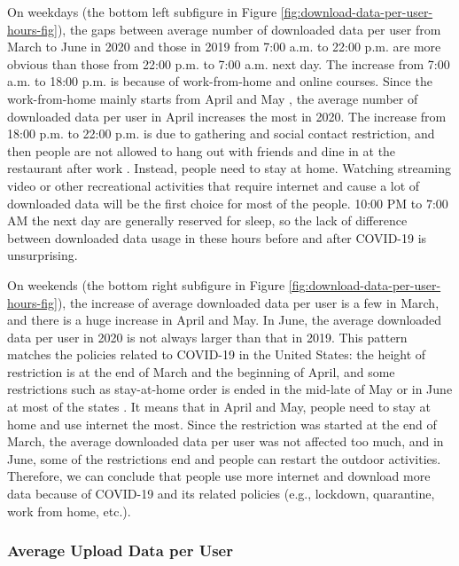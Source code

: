 On weekdays (the bottom left subfigure in Figure \ref{fig:download-data-per-user-hours-fig}), the gaps between average number of downloaded data per user from March to June in 2020 and those in 2019 from 7:00 a.m. to 22:00 p.m. are more obvious than those from 22:00 p.m. to 7:00 a.m. next day. The increase from 7:00 a.m. to 18:00 p.m. is because of work-from-home and online courses. Since the work-from-home mainly starts from April and May \cite{remotework}, the average number of downloaded data per user in April increases the most in 2020. The increase from 18:00 p.m. to 22:00 p.m. is due to gathering and social contact restriction, and then people are not allowed to hang out with friends and dine in at the restaurant after work \cite{lockdownsguide}. Instead, people need to stay at home. Watching streaming video or other recreational activities that require internet and cause a lot of downloaded data will be the first choice for most of the people. 10:00 PM to 7:00 AM the next day are generally reserved for sleep, so the lack of difference between downloaded data usage in these hours before and after COVID-19 is unsurprising. 

On weekends (the bottom right subfigure in Figure \ref{fig:download-data-per-user-hours-fig}), the increase of average downloaded data per user is a few in March, and there is a huge increase in April and May. In June, the average downloaded data per user in 2020 is not always larger than that in 2019. This pattern matches the policies related to COVID-19 in the United States: the height of restriction is at the end of March and the beginning of April, and some restrictions such as stay-at-home order is ended in the mid-late of May or in June at most of the states \cite{covid19restriction}. It means that in April and May, people need to stay at home and use internet the most. Since the restriction was started at the end of March, the average downloaded data per user was not affected too much, and in June, some of the restrictions end and people can restart the outdoor activities. Therefore, we can conclude that people use more internet and download more data because of COVID-19 and its related policies (e.g., lockdown, quarantine, work from home, etc.). 

\subsubsection{Average Upload Data per User}
\label{sec:upload-data-per-user-over-hours}


